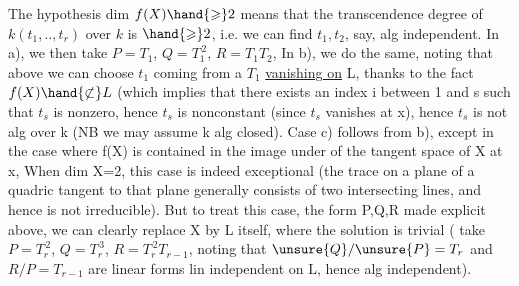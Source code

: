 
The hypothesis dim $f(X)\hand{\geqslant} 2$ means that the transcendence degree of
$k(t_1,..,t_r)$ over $k$ is $\hand{\geqslant} 2$, i.e. we can find $t_1,t_2$, say, alg independent.
In a), we then take $P = T_1$, $Q = T_1^{\,2}$, $R = T_1T_2$, In b), we
do the same,  noting that above we can
choose $t_1$ coming from a $T_1$ \uline{vanishing on} L, thanks to the fact $f(X)\hand{\not\subset} L$
(which implies that there exists an index i between 1 and s such that $t_s$ is
nonzero, hence $t_s$ is nonconstant (since $t_s$ vanishes at x), hence $t_s$ is not alg over k
(NB we may assume k alg closed). Case c) follows from b),  except in the case where  f(X) is contained in
the image  under  of the tangent space of X at x,  \hand{[}When dim X=2,
this case is indeed exceptional (the trace on a plane of a quadric tangent
to that plane generally consists of two intersecting
lines, and hence is not irreducible)\hand{]}. But to treat this case,  the
form P,Q,R made explicit above, we can clearly replace X by
L itself, where the solution is trivial ( take $P=T_r^{\,2}$, $Q=T_r^{\,3}$,
$R = T_r^{\,2}T_{r-1}$, noting that $\unsure{Q}/\unsure{P} = T_r$ and $R/P = T_{r-1}$ are
linear forms lin independent on L, hence alg independent). 

